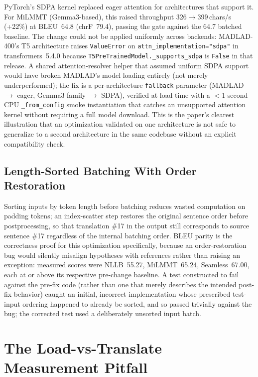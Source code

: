 \documentclass[conference]{IEEEtran}
\begin{document}
PyTorch's SDPA kernel replaced eager attention for architectures that
support it. For MiLMMT (Gemma3-based), this raised throughput
326$\to$399\,chars/s (+22\%) at BLEU~64.8 (chrF~79.4), passing the gate
against the 64.7 batched baseline. The change could not be applied
uniformly across backends: MADLAD-400's T5 architecture raises
\texttt{ValueError} on \texttt{attn\_implementation="sdpa"} in
transformers~5.4.0 because \texttt{T5PreTrainedModel.\_supports\_sdpa} is
\texttt{False} in that release. A shared attention-resolver helper that
assumed uniform SDPA support would have broken MADLAD's model loading
entirely (not merely underperformed); the fix is a per-architecture
\texttt{fallback} parameter (MADLAD $\to$ eager, Gemma3-family $\to$
SDPA), verified at load time with a $<$1-second CPU
\texttt{\_from\_config} smoke instantiation that catches an unsupported
attention kernel without requiring a full model download. This is the
paper's clearest illustration that an optimization validated on one
architecture is not safe to generalize to a second architecture in the
same codebase without an explicit compatibility check.

\subsection{Length-Sorted Batching With Order Restoration}

Sorting inputs by token length before batching reduces wasted computation
on padding tokens; an index-scatter step restores the original sentence
order before postprocessing, so that translation \#17 in the output still
corresponds to source sentence \#17 regardless of the internal batching
order. BLEU parity is the correctness proof for this optimization
specifically, because an order-restoration bug would silently misalign
hypotheses with references rather than raising an exception: measured
scores were NLLB~55.27, MiLMMT~65.24, Seamless~67.00, each at or above
its respective pre-change baseline. A test constructed to fail against
the pre-fix code (rather than one that merely describes the intended
post-fix behavior) caught an initial, incorrect implementation whose
prescribed test-input ordering happened to already be sorted, and so
passed trivially against the bug; the corrected test used a deliberately
unsorted input batch.

\section{The Load-vs-Translate Measurement Pitfall}
\label{sec:pitfall}
\end{document}
